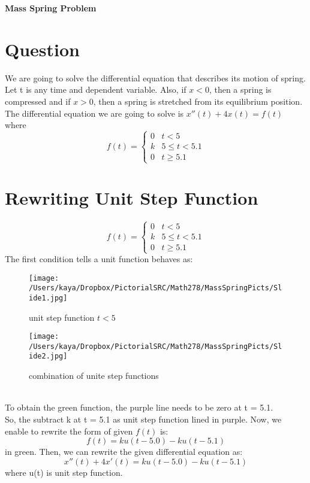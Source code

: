 \documentclass[12pt,letterpaper,fleqn]{article}
\begin{document}
\hfill
\begin{center}
{\LARGE\bf Mass Spring Problem}
\end{center}
\section{Question}
We are going to solve the differential equation that describes its motion of spring.
Let t is any time and dependent variable. Also, if $x < 0$, then a spring is compressed and if $x > 0$, then a spring is stretched from its equilibrium position.
The differential equation we are going to solve is $x''(t) + 4x(t) = f(t)$ where 
\[	f(t) = \begin{cases}
		0 &  t < 5\\
		k &  5 \leq t < 5.1\\
		0 &  t \geq 5.1
		\end{cases}
\]
\section{Rewriting Unit Step Function}
\[
	f(t) = \begin{cases}
		0 &  t < 5\\
		k &  5 \leq t < 5.1\\
		0 &  t \geq 5.1
		\end{cases}
\]
The first condition tells a unit function behaves as:\\
\begin{figure}[htbp]
	\begin{minipage}{0.5\hsize}
		\begin{center}
		\texttt{[image: /Users/kaya/Dropbox/PictorialSRC/Math278/MassSpringPicts/Slide1.jpg]}
		\caption{unit step function $t < 5$}
		\end{center}
	\end{minipage}
	\begin{minipage}{0.5\hsize}
		\begin{center}
			\texttt{[image: /Users/kaya/Dropbox/PictorialSRC/Math278/MassSpringPicts/Slide2.jpg]}
		\caption{combination of unite step functions}
		\end{center}
	\end{minipage}
\end{figure}\\
To obtain the green function, the purple line needs to be zero at t = 5.1.\\
So, the subtract k at t = 5.1 as unit step function lined in purple.
Now, we enable to rewrite the form of given $ f(t) $ is:
$$f(t) = ku(t-5.0)-ku(t-5.1) $$ in green.
Then, we can rewrite the given differential equation as:
$$x''(t) + 4x'(t) = ku(t-5.0)-ku(t-5.1)$$
where u(t) is unit step function.\\
\end{document}
